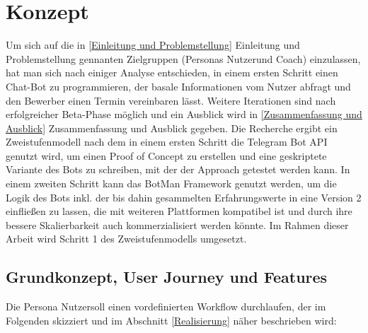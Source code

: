 \label{Konzept}
\chapter{Konzept}

Um sich auf die in \ref{Einleitung und Problemstellung} Einleitung und Problemstellung gennanten Zielgruppen (Personas \glqq Nutzer\grqq und \glqq Coach\grqq) einzulassen, hat man sich nach einiger Analyse entschieden, in einem ersten Schritt einen Chat-Bot zu programmieren, der basale Informationen vom Nutzer abfragt und den Bewerber einen Termin vereinbaren lässt. Weitere Iterationen sind nach erfolgreicher Beta-Phase möglich und ein Ausblick wird in \ref{Zusammenfassung und Ausblick} Zusammenfassung und Ausblick gegeben. Die Recherche ergibt ein Zweistufenmodell nach dem in einem ersten Schritt die Telegram Bot API genutzt wird, um einen Proof of Concept zu erstellen und eine geskriptete Variante des Bots zu schreiben, mit der der Approach getestet werden kann. In einem zweiten Schritt kann das BotMan Framework genutzt werden, um die Logik des Bots inkl. der bis dahin gesammelten Erfahrungswerte in eine Version 2 einfließen zu lassen, die mit weiteren Plattformen kompatibel ist und durch ihre bessere Skalierbarkeit auch kommerzialisiert werden könnte. Im Rahmen dieser Arbeit wird Schritt 1 des Zweistufenmodells umgesetzt.

\section{Grundkonzept, User Journey und Features} \label{Konzept: User Journey}
	Die Persona \glqq Nutzer\grqq  soll einen vordefinierten Workflow durchlaufen, der im Folgenden skizziert und im Abschnitt \ref*{Realisierung} näher beschrieben wird:

